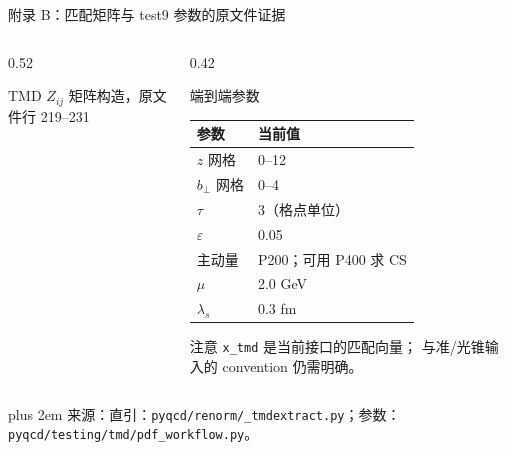 \documentclass[UTF8,aspectratio=169,11pt]{ctexbeamer}
\renewcommand{\arraystretch}{0.92}
\newcommand{\source}[1]{%
  \par\vspace{0.02em}\begingroup\fontsize{6}{6.8}\selectfont\raggedright\sloppy
  \setlength{\emergencystretch}{3em}\rightskip=0pt plus 2em
  \color{muted}来源：#1\par\endgroup}
\begin{document}
\begin{frame}[t]{附录 B：匹配矩阵与 test9 参数的原文件证据}
  \footnotesize
  \begin{columns}[T,totalwidth=\textwidth]
    \begin{column}{0.52\textwidth}
      \begin{block}{TMD \(Z_{ij}\) 矩阵构造，原文件行 219--231}
        
      \end{block}
    \end{column}
    \begin{column}{0.42\textwidth}
      \begin{block}{端到端参数}
        \scriptsize
        \renewcommand{\arraystretch}{0.78}
        \begin{tabular}{@{}ll@{}}
          \toprule
          参数 & 当前值\\
          \midrule
          \(z\) 网格 & 0--12\\
          \(b_\perp\) 网格 & 0--4\\
          \(\tau\) & 3（格点单位）\\
          \(\varepsilon\) & 0.05\\
          主动量 & P200；可用 P400 求 CS\\
          \(\mu\) & 2.0 GeV\\
          \(\lambda_s\) & 0.3 fm\\
          \bottomrule
        \end{tabular}
      \end{block}
      \begin{block}{注意}
        \scriptsize\texttt{x\_tmd} 是当前接口的匹配向量；
        与准/光锥输入的 convention 仍需明确。
      \end{block}
    \end{column}
  \end{columns}
  \source{直引：\nolinkurl{pyqcd/renorm/_tmdextract.py}；参数：\nolinkurl{pyqcd/testing/tmd/pdf_workflow.py}。}
\end{frame}
\end{document}
